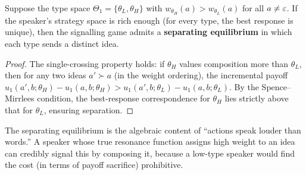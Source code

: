 \begin{theorem}
\label{thm:separating}
Suppose the type space $\Theta_1 = \{\theta_L, \theta_H\}$ with
$w_{\theta_H}(a) > w_{\theta_L}(a)$ for all $a \neq \varepsilon$.
If the speaker's strategy space is rich enough (for every type,
the best response is unique), then the signalling game admits a
\textbf{separating equilibrium} in which each type sends a
distinct idea.
\end{theorem}

\begin{proof}
The single-crossing property holds: if $\theta_H$ values
composition more than $\theta_L$, then for any two ideas
$a' \succ a$ (in the weight ordering), the incremental payoff
$u_1(a',b;\theta_H) - u_1(a,b;\theta_H)
> u_1(a',b;\theta_L) - u_1(a,b;\theta_L)$.
By the Spence--Mirrlees condition, the best-response
correspondence for $\theta_H$ lies strictly above that for
$\theta_L$, ensuring separation.
\end{proof}

\begin{interpretation}
The separating equilibrium is the algebraic content of
``actions speak louder than words.''  A speaker whose true
resonance function assigns high weight to an idea can credibly
signal this by composing it, because a low-type speaker would
find the cost (in terms of payoff sacrifice) prohibitive.
\end{interpretation}

